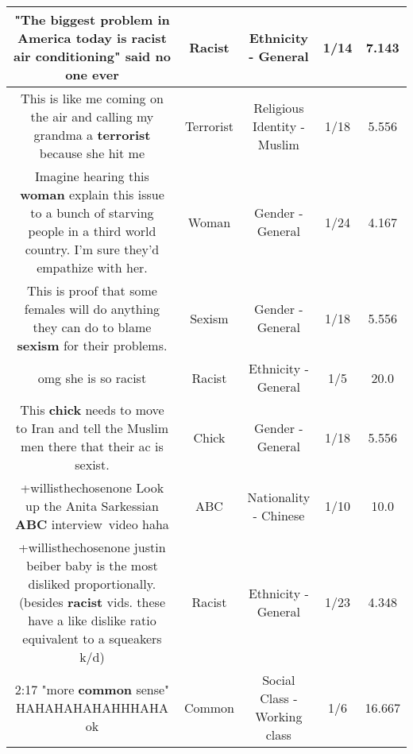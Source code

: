 \documentclass[11pt]{article}
\newlength\mylength
\begin{document}
\begin{center}
\begin{longtable}{|C{.65\mylength}|C{.30\mylength}|C{.12\mylength}|C{.12\mylength}|C{.12\mylength}|}
  \small "The biggest problem in America today is \textbf{racist} air conditioning" said no one ever\normalsize   & Racist & Ethnicity - General & 1/14 & 7.143 \\  \hline
  \small This is like me coming on the air and calling my grandma a \textbf{terrorist} because she hit me\normalsize   & Terrorist & Religious Identity - Muslim & 1/18 & 5.556 \\  \hline
  \small Imagine hearing this \textbf{woman} explain this issue to a bunch of starving people in a third world country. I'm sure they'd empathize with her.\normalsize   & Woman & Gender - General & 1/24 & 4.167 \\  \hline
  \small This is proof that some females will do anything they can do to blame \textbf{sexism} for their problems.\normalsize   & Sexism & Gender - General & 1/18 & 5.556 \\  \hline
  \small omg she is so racist\normalsize   & Racist & Ethnicity - General & 1/5 & 20.0 \\  \hline
  \small This \textbf{chick} needs to move to Iran and tell the Muslim men there that their ac is sexist.\normalsize   & Chick & Gender - General & 1/18 & 5.556 \\  \hline
  \small +willisthechosenone Look up the Anita Sarkessian \textbf{ABC} interview video haha\normalsize   & ABC & Nationality - Chinese & 1/10 & 10.0 \\  \hline
  \small +willisthechosenone justin beiber baby is the most disliked proportionally. (besides \textbf{racist} vids. these have a like dislike ratio equivalent to a squeakers k/d)\normalsize   & Racist & Ethnicity - General & 1/23 & 4.348 \\  \hline
  \small 2:17 "more \textbf{common} sense" HAHAHAHAHAHHHAHA ok\normalsize   & Common & Social Class - Working class & 1/6 & 16.667 \\  \hline

\end{longtable}
\end{center}
\end{document}
